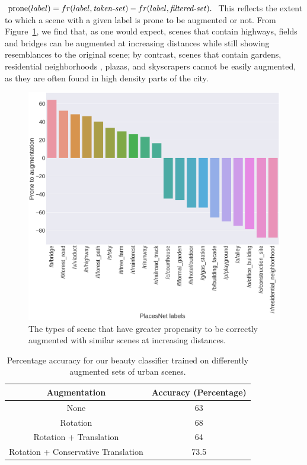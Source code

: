 $ \textrm{prone}(label)= fr(label,\textrm{\emph{taken-set}}) - fr(label,\textrm{\emph{filtered-set}}).$
This reflects the extent to which a scene with a given label is prone to be augmented or not. From Figure~\ref{fig:augmentationSimilarity}, we find that, as one would expect, scenes that contain highways, fields and bridges can be augmented at increasing distances while still showing resemblances to the original scene; by contrast, scenes that contain gardens, residential neighborhoods , plazas, and skyscrapers cannot be easily augmented, as they are often found in high density parts of the city.


\begin{figure}[t!]
	\centering
	\includegraphics[width=\columnwidth]{Plot/SimilarityPlacesPrevalence.png}
	\caption{The types of scene that have greater propensity to be correctly augmented with similar scenes at increasing distances.}
	\label{fig:augmentationSimilarity}
\end{figure}




\begin{table}[t!]
	\centering
	\begin{tabular}{|c|c|}
		\hline
		\textbf{Augmentation} & \textbf{Accuracy (Percentage)}\\
		\hline
		None & 63 \\
		\hline
		Rotation  & 68 \\
		\hline
		Rotation + Translation  & 64 \\
		\hline
		Rotation + Conservative Translation & 73.5 \\
		\hline
	\end{tabular}
	\caption{Percentage accuracy for our beauty classifier trained on differently augmented sets of  urban scenes.}
	\label{tab:classifier}
    \vspace{-10mm}
\end{table}


